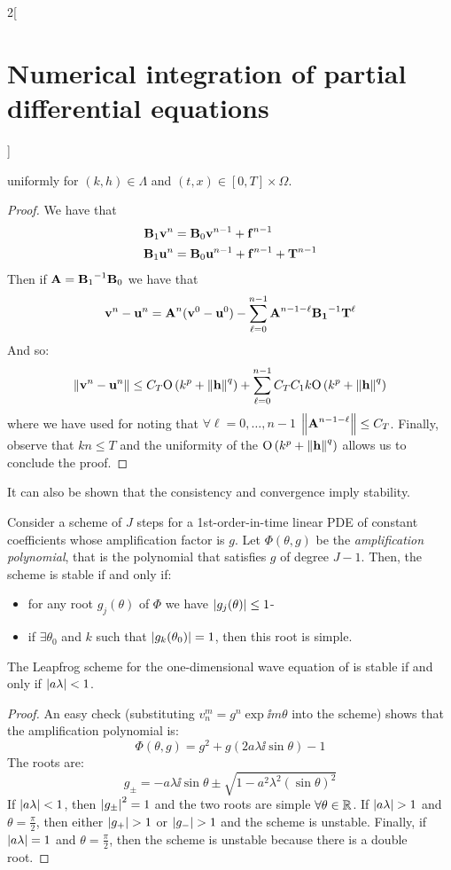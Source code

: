 \documentclass[../../../main_math.tex]{subfiles}
\begin{document}
\begin{multicols}{2}[\section{Numerical integration of partial differential equations}]
\begin{theorem}
$$    $$
    uniformly for $(k,h)\in\Lambda$ and $(t,x)\in[0,T]\times\Omega$.
  \end{theorem}
  \begin{proof}
    We have that
    \begin{align*}
      \boldsymbol{\mathrm{B}}_1\boldsymbol{\mathrm{v}}^{n} & =\boldsymbol{\mathrm{B}}_0\boldsymbol{\mathrm{v}}^{n-1}+\boldsymbol{\mathrm{f}}^{n-1}               \\
      \boldsymbol{\mathrm{B}}_1\boldsymbol{\mathrm{u}}^{n} & =\boldsymbol{\mathrm{B}}_0\boldsymbol{\mathrm{u}}^{n-1} +\boldsymbol{\mathrm{f}}^{n-1}+\boldsymbol{\mathrm{T}}^{n-1}
    \end{align*}
    Then if $\boldsymbol{\mathrm{A}}= {\boldsymbol{\mathrm{B}}_1}^{-1}\boldsymbol{\mathrm{B}}_0$ we have that
    $$\boldsymbol{\mathrm{v}}^n-\boldsymbol{\mathrm{u}}^n=\boldsymbol{\mathrm{A}}^n(\boldsymbol{\mathrm{v}}^0-\boldsymbol{\mathrm{u}}^0)-\sum_{\ell=0}^{n-1}\boldsymbol{\mathrm{A}}^{n-1-\ell}{\boldsymbol{\mathrm{B_1}}}^{-1}\boldsymbol{\mathrm{T}}^\ell$$
    And so:
    $$
      \left\|\boldsymbol{\mathrm{v}}^n-\boldsymbol{\mathrm{u}}^n\right\|\leq C_T \mathrm{O}\left(k^p+\left\|\boldsymbol{\mathrm{h}}\right\|^q\right)+\sum_{\ell=0}^{n-1}C_T C_1k\mathrm{O}\left(k^p+\left\|\boldsymbol{\mathrm{h}}\right\|^q\right)
    $$
    where we have used  for noting that $\forall\ell=0,\ldots,n-1$ $\left\|\boldsymbol{\mathrm{A}}^{n-1-\ell}\right\|\leq C_T$.
    Finally, observe that $kn\leq T$ and the uniformity of the $\mathrm{O}\left(k^p+\left\|\boldsymbol{\mathrm{h}}\right\|^q\right)$ allows us to conclude the proof.
  \end{proof}
  \begin{remark}
    It can also be shown that the consistency and convergence imply stability.
  \end{remark}
  \begin{theorem}
    Consider a scheme of $J$ steps for a 1st-order-in-time linear PDE of constant coefficients whose amplification factor is $g$. Let $\Phi(\theta, g)$ be the \emph{amplification polynomial}, that is the polynomial that satisfies $g$ of degree $J-1$. Then, the scheme is stable if and only if:
    \begin{itemize}
      \item for any root $g_j(\theta)$ of $\Phi$ we have $\abs{g_j(\theta)}\leq 1$-
      \item if $\exists \theta_0$ and $k$ such that $\abs{g_k(\theta_0)}=1$, then this root is simple.
    \end{itemize}
  \end{theorem}
  \begin{proposition}
    The Leapfrog scheme for the one-dimensional wave equation of  is stable if and only if $\abs{a\lambda}< 1$.
  \end{proposition}
  \begin{proof}
    An easy check (substituting $v_n^m=g^n \exp{\ii m\theta}$ into the scheme) shows that the amplification polynomial is:
    $$
      \Phi(\theta,g)=g^2+g(2a\lambda\ii\sin\theta)-1
    $$
    The roots are:
    $$
      g_{\pm} = -a\lambda\ii\sin\theta\pm\sqrt{1-a^2\lambda^2{(\sin\theta)}^2}
    $$
    If $\abs{a\lambda}<1$, then $\abs{g_{\pm}}^2=1$ and the two roots are simple $\forall \theta\in\mathbb{R}$. If $\abs{a\lambda}>1$ and $\theta=\frac{\pi}{2}$, then either $\abs{g_+}>1$ or $\abs{g_-}>1$ and the scheme is unstable. Finally, if $\abs{a\lambda}=1$ and $\theta=\frac{\pi}{2}$, then the scheme is unstable because there is a double root.
  \end{proof}

\end{multicols}
\end{document}
